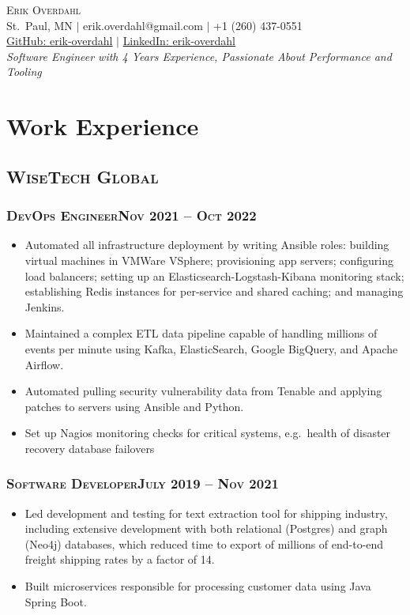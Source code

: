 \documentclass{article}
\newcommand{\resumeSection}[1]{\section*{#1}}
\newcommand{\institution}[1]{\subsection*{\scshape{#1}}}
\newcommand{\jobPosition}[3]{\subsubsection*{\scshape{#1}\hfill #2 -- #3}}
\begin{document}
\begin{center}
  {\Huge\scshape{Erik Overdahl}}
  \\\vspace{5pt}
  \normalsize{
    St.\ Paul, MN
    $|$
    erik.overdahl@gmail.com
    $|$
    +1 (260) 437-0551
    \\
    \href{https://github.com/erik-overdahl}{GitHub: \underline{erik-overdahl}}
    $|$
    \href{https://linkedin.com/in/erik-overdahl}{LinkedIn: \underline{erik-overdahl}}
  }
\\\vspace{5pt}
  {\large\emph{
      Software Engineer with 4 Years Experience, Passionate About
      Performance and Tooling
    }
  }
\end{center}

\resumeSection{Work Experience}

  \institution{WiseTech Global}

    \jobPosition{DevOps Engineer}{Nov 2021}{Oct 2022}
    \begin{itemize}[noitemsep]
      \item
            Automated all infrastructure deployment by writing Ansible
            roles: building virtual machines in VMWare VSphere; provisioning app
            servers; configuring load balancers; setting up an
            Elasticsearch-Logstash-Kibana monitoring stack; establishing Redis
            instances for per-service and shared caching; and managing Jenkins.
      \item
            Maintained a complex ETL data pipeline capable of handling
            millions of events per minute using Kafka, ElasticSearch, Google BigQuery,
            and Apache Airflow.
      \item
            Automated pulling security vulnerability data from Tenable and
            applying patches to servers using Ansible and Python.
      \item
            Set up Nagios monitoring checks for critical systems, e.g.\ health of disaster recovery database failovers
    \end{itemize}

    \jobPosition{Software Developer}{July 2019}{Nov 2021}
    \begin{itemize}[noitemsep]
      \item
            Led development and testing for text extraction tool for
            shipping industry, including extensive development with
            both relational (Postgres) and graph (Neo4j) databases, which reduced time to
            export of millions of end-to-end freight shipping rates by
            a factor of 14.
      \item
            Built microservices responsible for processing customer
            data using Java Spring Boot.
    \end{itemize}
\end{document}
